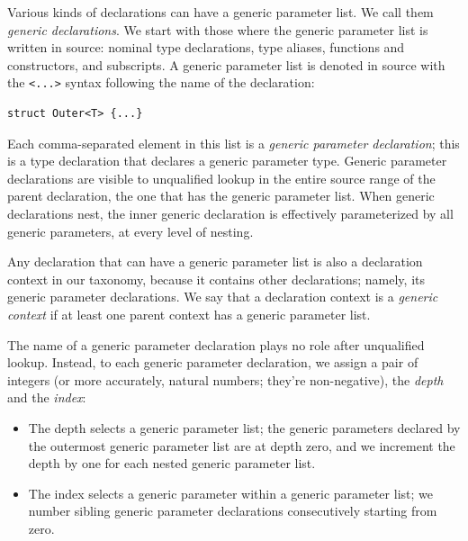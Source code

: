 \documentclass[../generics]{subfiles}
\begin{document}
Various kinds of declarations can have a generic parameter list. We call them \emph{generic declarations}. We start with those where the generic parameter list is written in source: nominal type declarations, type aliases, functions and constructors, and subscripts. A generic parameter list is denoted in source with the \texttt{<...>} syntax following the name of the declaration:
\begin{Verbatim}
struct Outer<T> {...}
\end{Verbatim}
Each comma-separated element in this list is a \emph{generic parameter declaration}; this is a type declaration that declares a generic parameter type. Generic parameter declarations are visible to unqualified lookup in the entire source range of the parent declaration, the one that has the generic parameter list. When generic declarations nest, the inner generic declaration is effectively parameterized by all generic parameters, at every level of nesting.

Any declaration that can have a generic parameter list is also a declaration context in our taxonomy, because it contains other declarations; namely, its generic parameter declarations. We say that a declaration context is a \emph{generic context} if at least one parent context has a generic parameter list.

The name of a generic parameter declaration plays no role after unqualified lookup. Instead, to each generic parameter declaration, we assign a pair of integers (or more accurately, natural numbers; they're non-negative), the \emph{depth} and the \emph{index}:
\begin{itemize}
\item The depth selects a generic parameter list; the generic parameters declared by the outermost generic parameter list are at depth zero, and we increment the depth by one for each nested generic parameter list.
\item The index selects a generic parameter within a generic parameter list; we number sibling generic parameter declarations consecutively starting from zero.
\end{itemize}
\end{document}
